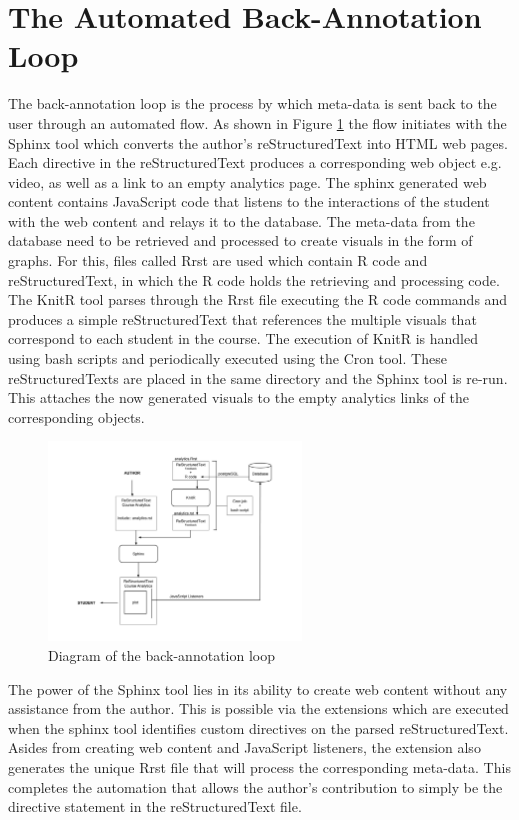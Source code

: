 \documentclass[a4paper, 11pt, conference]{ieeeconf}
\begin{document}
\section{The Automated Back-Annotation Loop}

The back-annotation loop is the process by which meta-data is sent back to the user through an automated flow. As shown in Figure \ref{fig:loop} the flow initiates with the Sphinx tool which converts the author's reStructuredText into HTML web pages. Each directive in the reStructuredText produces a corresponding web object e.g. video, as well as a link to an empty analytics page. The sphinx generated web content contains JavaScript code that listens to the interactions of the student with the web content and relays it to the database. The meta-data from the database need to be retrieved and processed to create visuals in the form of graphs. For this, files called Rrst are used which contain R code and reStructuredText, in which the R code holds the retrieving and processing code. The KnitR tool parses through the Rrst file executing the R code commands and produces a simple reStructuredText that references the multiple visuals that correspond to each student in the course. The execution of KnitR is handled using bash scripts and periodically executed using the Cron tool. These reStructuredTexts are placed in the same directory and the Sphinx tool is re-run. This attaches the now generated visuals to the empty analytics links of the corresponding objects.

\begin{figure}
\centering
\includegraphics[width=0.6\textwidth]{loop.png}
\caption{\label{fig:loop}Diagram of the back-annotation loop}
\end{figure}

The power of the Sphinx tool lies in its ability to create web content without any assistance from the author. This is possible via the extensions which are executed when the sphinx tool identifies custom directives on the parsed reStructuredText. Asides from creating web content and JavaScript listeners, the extension also generates the unique Rrst file that will process the corresponding meta-data. This completes the automation that allows the author's contribution to simply be the directive statement in the reStructuredText file.
\end{document}

